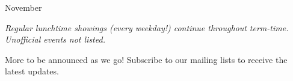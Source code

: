 \begin{calendar}{November}
  \calendarhead
  \calendarweek{
    \calendarday{}
    &\calendarday{}
    &\calendarday{}
    &\calendarday{}
    &\calendarday{}
    &\calendarday{}
    &\calendarday{}
  }
  \calendarweek{
    \calendarday{}
    &\calendarday{}
    &\calendarday{}
    &\calendarday{}
    &\calendarday{}
    &\calendarday{}
    &\calendarday{}
  }
\end{calendar}

\vspace{\fill}

\begin{center}
  \begin{minipage}{0.65\textwidth}
    \itshape
  Regular lunchtime showings (every weekday!) continue throughout
  term-time. Unofficial events not listed.

  More to be announced as we go! Subscribe to our mailing lists to
  receive the latest updates.
\end{minipage}
\end{center}

\vspace{\fill}
